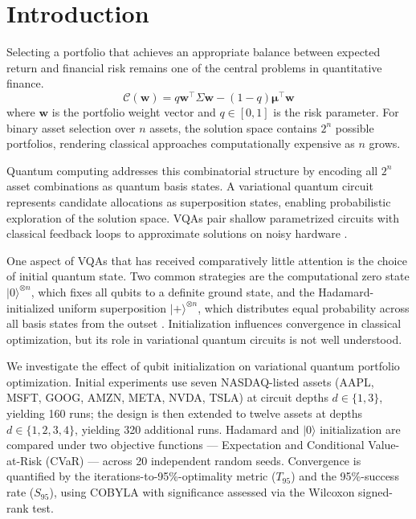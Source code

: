 \documentclass[runningheads]{llncs}
\begin{document}
\section{Introduction}
Selecting a portfolio that achieves an appropriate balance between expected return and financial risk remains one of the central problems in quantitative finance.
\begin{equation}
    \mathcal{C}(\mathbf{w}) = q\mathbf{w}^\top \Sigma \mathbf{w} 
    - (1 - q)\boldsymbol{\mu}^\top \mathbf{w}
\end{equation}
where $\mathbf{w}$ is the portfolio weight vector and $q\in [0,1]$ is the risk parameter. For binary asset selection over $n$ assets, the solution space contains $2^n$ possible portfolios, rendering classical approaches computationally expensive as $n$ grows.

Quantum computing addresses this combinatorial structure by encoding all $2^n$ asset combinations as quantum basis states. A variational quantum circuit represents candidate allocations as superposition states, enabling probabilistic exploration of the solution space. VQAs pair shallow parametrized circuits with classical feedback loops to approximate solutions on noisy hardware \cite{cerezo2021}.

One aspect of VQAs that has received comparatively little attention is the choice of initial quantum state. Two common strategies are the computational zero state $|0\rangle^{\otimes n}$, which fixes all qubits to a definite ground state, and the Hadamard-initialized uniform superposition $|+\rangle^{\otimes n}$, which distributes equal probability across all basis states from the outset \cite{nielsen2010}. Initialization influences convergence in classical optimization, but its role in variational quantum circuits is not well understood.

We investigate the effect of qubit initialization on variational quantum portfolio optimization. Initial experiments use seven NASDAQ-listed assets (AAPL, MSFT, GOOG, AMZN, META, NVDA, TSLA) at circuit depths $d \in \{1, 3\}$, yielding 160 runs; the design is then extended to twelve assets at depths $d \in \{1, 2, 3, 4\}$, yielding 320 additional runs. Hadamard and $|0\rangle$ initialization are compared under two objective functions --- Expectation and Conditional Value-at-Risk (CVaR) \cite{rockafellar2000} --- across 20 independent random seeds. Convergence is quantified by the iterations-to-95\%-optimality metric ($T_{95}$) and the 95\%-success rate ($S_{95}$), using COBYLA with significance assessed via the Wilcoxon signed-rank test.
\end{document}
